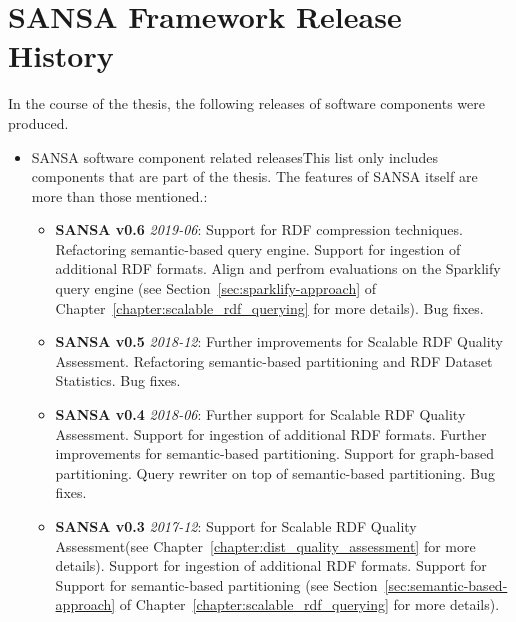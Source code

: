 \chapter{SANSA Framework Release History}
\label{sec:appendix-sansa-releases}

In the course of the thesis, the following releases of software components were produced.

\begin{itemize}
    \item SANSA software component related releases\f{This list only includes components that are part of the thesis. 
    The features of SANSA itself are more than those mentioned.}:
    \begin{itemize}
        
        \item \textbf{SANSA v0.6} \textit{2019-06}:
        Support for RDF compression techniques.
        Refactoring semantic-based query engine.
        Support for ingestion of additional RDF formats.
        Align and perfrom evaluations on the Sparklify query engine (see Section~\ref{sec:sparklify-approach} of Chapter~\ref{chapter:scalable_rdf_querying} for more details).
        Bug fixes.
        
        \item \textbf{SANSA v0.5} \textit{2018-12}: 
        Further improvements for Scalable RDF Quality Assessment. 
        Refactoring semantic-based partitioning and RDF Dataset Statistics.
        Bug fixes.
        
        \item \textbf{SANSA v0.4} \textit{2018-06}:
        Further support for Scalable RDF Quality Assessment. 
        Support for ingestion of additional RDF formats.
        Further improvements for semantic-based partitioning.
        Support for graph-based partitioning.
        Query rewriter on top of semantic-based partitioning.
        Bug fixes.
        
        \item \textbf{SANSA v0.3} \textit{2017-12}: 
        Support for Scalable RDF Quality Assessment(see Chapter~\ref{chapter:dist_quality_assessment} for more details). 
        Support for ingestion of additional RDF formats.
        Support for Support for semantic-based partitioning (see Section~\ref{sec:semantic-based-approach} of Chapter~\ref{chapter:scalable_rdf_querying} for more details).
        

\end{itemize}
\end{itemize}
